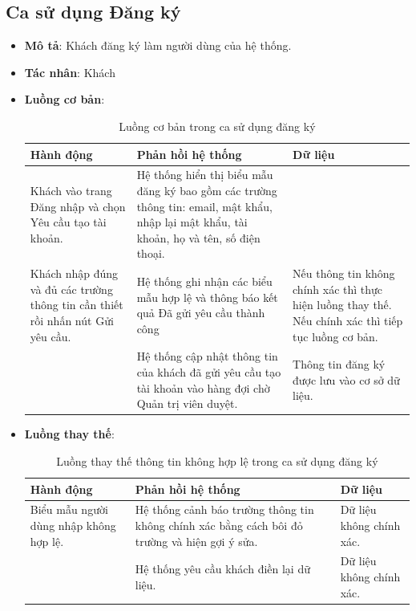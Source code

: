 \documentclass[./../main.tex]{subfiles}
\begin{document}
\subsection{Ca sử dụng Đăng ký}
\begin{itemize}
    \item \textbf{Mô tả}: Khách đăng ký làm người dùng của hệ thống.
    \item \textbf{Tác nhân}: Khách
    \item \textbf{Luồng cơ bản}:
    \begin{table}[H]
    \caption{\label{uc-1}Luồng cơ bản trong ca sử dụng đăng ký}
    \begin{tabularx}{\textwidth}{| X | X | X |}
        \hline
        \textbf{Hành động} & \textbf{Phản hồi hệ thống} & \textbf{Dữ liệu} \\ \hline
        Khách vào trang Đăng nhập và chọn Yêu cầu tạo tài khoản. & Hệ thống hiển thị biểu mẫu đăng ký bao gồm các trường thông tin: email, mật khẩu, nhập lại mật khẩu, tài khoản, họ và tên, số điện thoại. &
        \\ \hline
        Khách nhập đúng và đủ các trường thông tin cần thiết rồi nhấn nút Gửi yêu cầu. & Hệ thống ghi nhận các biểu mẫu hợp lệ và thông báo kết quả Đã gửi yêu cầu thành công & Nếu thông tin không chính xác thì thực hiện luồng thay thế. Nếu chính xác thì tiếp tục luồng cơ bản.
        \\ \hline
        & Hệ thống cập nhật thông tin của khách đã gửi yêu cầu tạo tài khoản vào hàng đợi chờ Quản trị viên duyệt. & Thông tin đăng ký được lưu vào cơ sở dữ liệu.
        \\ \hline
    \end{tabularx}
    \end{table}
    \item \textbf{Luồng thay thế}:
    \begin{table}[H]
    \caption{\label{uc-2}Luồng thay thế thông tin không hợp lệ trong ca sử dụng đăng ký}
    \begin{tabularx}{\textwidth}{| X | X | X |}
        \hline
        \textbf{Hành động} & \textbf{Phản hồi hệ thống} & \textbf{Dữ liệu} \\ \hline
        Biểu mẫu người dùng nhập không hợp lệ. & Hệ thống cảnh báo trường thông tin không chính xác bằng cách bôi đỏ trường và hiện gợi ý sửa. & Dữ liệu không chính xác.
        \\ \hline
        & Hệ thống yêu cầu khách điền lại dữ liệu. & Dữ liệu không chính xác.
        \\ \hline

\end{tabularx}
\end{table}
\end{itemize}
\end{document}

